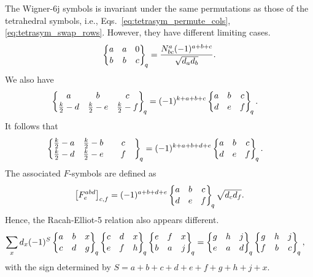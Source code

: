 The Wigner-6j symbols is invariant under the same permutations as those of the tetrahedral symbols, i.e., Eqs.~\eqref{eq:tetrasym_permute_cols}, \eqref{eq:tetrasym_swap_rows}.
However, they have different limiting cases.
\begin{align}
	\Wsixj{a & a & 0}{b & b & c} = \frac{N^a_{bc} (-1)^{a+b+c}}{\sqrt{d_a d_b}} .
	\label{eq:Wigner6j_limit}
\end{align}
We also have
\begin{align}
	\Wsixj{a & b & c}{\frac{k}{2}-d & \frac{k}{2}-e & \frac{k}{2}-f}
		&= (-1)^{k+a+b+c}
		\Wsixj{a & b & c}{d & e & f} .
\end{align}
It follows that
\begin{align}
	\renewcommand{\arraystretch}{1.1}
	\Wsixj{\frac{k}{2}-a & \frac{k}{2}-b & c}{\frac{k}{2}-d & \frac{k}{2}-e & \quad f\quad}
		&= (-1)^{k+a+b+d+e}
		\Wsixj{a & b & c}{d & e & f} .
\end{align}
The associated $F$-symbols are defined as
\begin{align}
	\big[F_e^{abd}\big]_{c,f} = (-1)^{a+b+d+e} \Wsixj{a&b&c}{d&e&f} \sqrt{d_c d_f} .
\end{align}
Hence, the Racah-Elliot-5 relation also appears different.
\begin{align}
	\sum_x d_x (-1)^{S}
		\Wsixj{a & b & x}{c & d & g} \Wsixj{c & d & x}{e & f & h} \Wsixj{e & f & x}{b & a & j}
	&= \Wsixj{g & h & j}{e & a & d} \Wsixj{g & h & j}{f & b & c} ,
\end{align}
with the sign determined by $S = a+b+c+d+e+f+g+h+j+x$.





